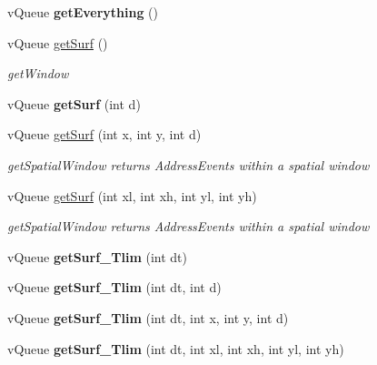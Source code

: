 \begin{DoxyCompactItemize}
v\+Queue {\bfseries get\+Everything} ()
\item 
v\+Queue \hyperlink{classev_1_1vSurface2_aedcc28d0ccdbc343f031506a8fa84bb0}{get\+Surf} ()
\begin{DoxyCompactList}\small\item\em get\+Window \end{DoxyCompactList}\item 
\mbox{\label{classev_1_1vSurface2_aaa5978b3d040e278db563495585adf86}} 
v\+Queue {\bfseries get\+Surf} (int d)
\item 
v\+Queue \hyperlink{classev_1_1vSurface2_a42f7a69a075225254ffddc7bb5d4d9ba}{get\+Surf} (int x, int y, int d)
\begin{DoxyCompactList}\small\item\em get\+Spatial\+Window returns Address\+Events within a spatial window \end{DoxyCompactList}\item 
v\+Queue \hyperlink{classev_1_1vSurface2_aa74adc0c56d62a6f51c2901ec209233e}{get\+Surf} (int xl, int xh, int yl, int yh)
\begin{DoxyCompactList}\small\item\em get\+Spatial\+Window returns Address\+Events within a spatial window \end{DoxyCompactList}\item 
\mbox{\label{classev_1_1vSurface2_a70e292820956b12c3bc123c4e724e90a}} 
v\+Queue {\bfseries get\+Surf\+\_\+\+Tlim} (int dt)
\item 
\mbox{\label{classev_1_1vSurface2_ad487a13d9bcd8433489fb7e7b3fa5dc8}} 
v\+Queue {\bfseries get\+Surf\+\_\+\+Tlim} (int dt, int d)
\item 
\mbox{\label{classev_1_1vSurface2_a53939fc4b201eaee766114982d0ae9c2}} 
v\+Queue {\bfseries get\+Surf\+\_\+\+Tlim} (int dt, int x, int y, int d)
\item 
\mbox{\label{classev_1_1vSurface2_a63c601ec2570dbde037c9ea92342b24b}} 
v\+Queue {\bfseries get\+Surf\+\_\+\+Tlim} (int dt, int xl, int xh, int yl, int yh)
\item 
\mbox{\label{classev_1_1vSurface2_acb41c1eff67ff285be715f8504d37d22}} 

\end{DoxyCompactItemize}
